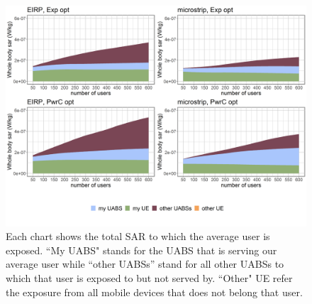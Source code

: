 \begin{figure}[h!]
  \includegraphics[width=\textwidth]{../results/s3/uFourSources.png}
  \caption{Each chart shows the total SAR to which the average user is exposed. ``My UABS" stands for the UABS that is serving our average user while ``other UABSs'' stand for 
  all other UABSs to which that user is exposed to but not served by. ``Other" UE refer the exposure from all mobile devices that does not belong that user.}
  \label{fig:s3b_fourSourcesMatrix}
\end{figure}